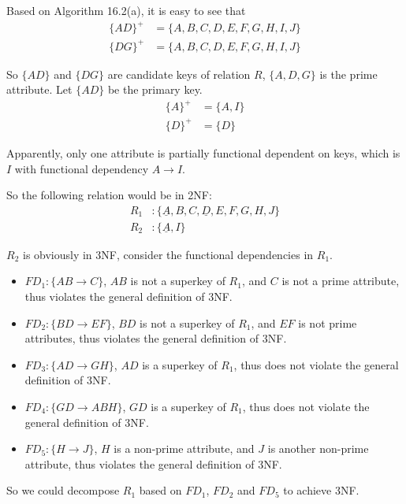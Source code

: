 \documentclass[11pt,letterpaper,titlepage,en-US]{article}
\begin{document}
\begin{homeworkProblem}
    Based on Algorithm 16.2(a), it is easy to see that
    \begin{align*}
        \{AD\}^+ &= \{A,B,C,D,E,F,G,H,I,J\} \\
        \{DG\}^+ &= \{A,B,C,D,E,F,G,H,I,J\}
    \end{align*}

    So $\{AD\}$ and $\{DG\}$ are candidate keys of relation $R$, $\{A, D, G\}$ is the prime attribute. Let $\{AD\}$ be the primary key.
    \begin{align*}
        \{A\}^+ &= \{A, I\}\\
        \{D\}^+ &= \{D\}
    \end{align*}

    Apparently, only one attribute is partially functional dependent on keys,
    which is $I$ with functional dependency $A \rightarrow I$.

    So the following relation would be in 2NF:
    \begin{align*}
        R_1& : \{\underline{A}, B, C, \underline{D}, E, F, G, H, J\}\\
        R_2& : \{\underline{A}, I\}
    \end{align*}

    $R_2$ is obviously in 3NF,
    consider the functional dependencies in $R_1$.
    \begin{itemize}
        \item $FD_1: \{AB \rightarrow C\}$, $AB$ is not a superkey of $R_1$,
            and $C$ is not a prime attribute,
            thus violates the general definition of 3NF.
        \item $FD_2: \{BD \rightarrow EF\}$, $BD$ is not a superkey of $R_1$,
            and $EF$ is not prime attributes,
            thus violates the general definition of 3NF.
        \item $FD_3: \{AD \rightarrow GH\}$, $AD$ is a superkey of $R_1$,
            thus does not violate the general definition of 3NF.
        \item $FD_4: \{GD \rightarrow ABH\}$, $GD$ is a superkey of $R_1$,
            thus does not violate the general definition of 3NF.
        \item $FD_5: \{H \rightarrow J\}$, $H$ is a non-prime attribute,
            and $J$ is another non-prime attribute,
            thus violates the general definition of 3NF.
    \end{itemize}

    So we could decompose $R_1$ based on $FD_1$, $FD_2$ and $FD_5$ to achieve 3NF.


\end{homeworkProblem}
\end{document}
